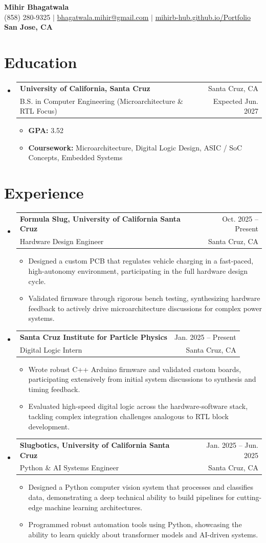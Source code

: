 \documentclass[letterpaper,11pt]{article}
\makeatletter
\newcommand{\resumeItem}[1]{\item{#1}}
\newcommand{\resumeSubheading}[4]{
  \item
    \begin{tabular*}{0.97\textwidth}[t]{l@{\extracolsep{\fill}}r}
      \textbf{#1} & #2 \\
      #3 & #4 \\
    \end{tabular*}
}
\newcommand{\resumeSubHeadingListStart}{\begin{itemize}[label=\textbullet]}
\newcommand{\resumeSubHeadingListEnd}{\end{itemize}}
\newcommand{\resumeItemListStart}{\begin{itemize}[label=-]}
\newcommand{\resumeItemListEnd}{\end{itemize}}
\makeatother
\begin{document}
\begin{center}
  {\Large\bfseries Mihir Bhagatwala} \\
  {(858) 280-9325 $\vert$ \href{mailto:bhagatwala.mihir@gmail.com}{bhagatwala.mihir@gmail.com} $\vert$ \href{https://mihirb-hub.github.io/Portfolio/}{mihirb-hub.github.io/Portfolio}} \\
  {\textbf{San Jose, CA}}
\end{center}

\section{Education}
\resumeSubHeadingListStart
  \resumeSubheading{University of California, Santa Cruz}{Santa Cruz, CA}{B.S. in Computer Engineering (Microarchitecture \& RTL Focus)}{Expected Jun. 2027}
  \resumeItemListStart
    \resumeItem{\textbf{GPA:} 3.52}
    \resumeItem{\textbf{Coursework:} Microarchitecture, Digital Logic Design, ASIC / SoC Concepts, Embedded Systems}
  \resumeItemListEnd
\resumeSubHeadingListEnd

\section{Experience}
\resumeSubHeadingListStart
  \resumeSubheading{Formula Slug, University of California Santa Cruz}{Oct. 2025 -- Present}{Hardware Design Engineer}{Santa Cruz, CA}
  \resumeItemListStart
    \resumeItem{Designed a custom PCB that regulates vehicle charging in a fast-paced, high-autonomy environment, participating in the full hardware design cycle.}
    \resumeItem{Validated firmware through rigorous bench testing, synthesizing hardware feedback to actively drive microarchitecture discussions for complex power systems.}
  \resumeItemListEnd

  \resumeSubheading{Santa Cruz Institute for Particle Physics}{Jan. 2025 -- Present}{Digital Logic Intern}{Santa Cruz, CA}
  \resumeItemListStart
    \resumeItem{Wrote robust C++ Arduino firmware and validated custom boards, participating extensively from initial system discussions to synthesis and timing feedback.}
    \resumeItem{Evaluated high-speed digital logic across the hardware-software stack, tackling complex integration challenges analogous to RTL block development.}
  \resumeItemListEnd

  \resumeSubheading{Slugbotics, University of California Santa Cruz}{Jan. 2025 -- Jun. 2025}{Python \& AI Systems Engineer}{Santa Cruz, CA}
  \resumeItemListStart
    \resumeItem{Designed a Python computer vision system that processes and classifies data, demonstrating a deep technical ability to build pipelines for cutting-edge machine learning architectures.}
    \resumeItem{Programmed robust automation tools using Python, showcasing the ability to learn quickly about transformer models and AI-driven systems.}
  \resumeItemListEnd
\resumeSubHeadingListEnd
\end{document}
